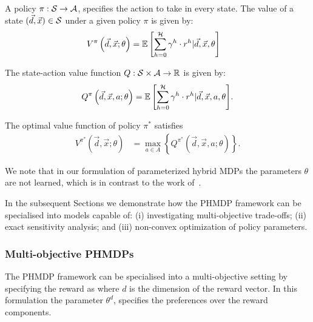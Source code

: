 A policy {\footnotesize $\pi : \mathcal{S} \rightarrow \mathcal{A}$}, specifies the action to take in every state. The value of a state {\footnotesize $(\vec{d}, \vec{x}) \in \mathcal{S}$} under a given policy {\footnotesize$\pi$} is given by:
{\footnotesize 
    \abovedisplayskip=0pt
    \belowdisplayskip=0pt
\begin{align*}
    V^{\pi}\left( \vec{d}, \vec{x}; \theta \right) &= {\mathbb{E}\left[{\sum\limits_{h = 0}^{\mathcal{H}} \gamma^h \cdot r^h | \vec{d}, \vec{x}, \theta}\right]} \nonumber  
\end{align*}
}

The state-action value function {\footnotesize$Q : \mathcal{S} \times \mathcal{A} \rightarrow \mathbb{R}$} is given by:
{\footnotesize 
    \abovedisplayskip=0pt
    \belowdisplayskip=0pt
\begin{align*}
    Q^{\pi}\left(\vec{d}, \vec{x}, a; \theta\right) = {\mathbb{E}\left[{\sum\limits_{h = 0}^{\mathcal{H}} \gamma^h \cdot r^h | \vec{d}, \vec{x}, a, \theta}\right]}.
\end{align*}
}

The optimal value function of policy {\footnotesize$ \pi^{*} $} satisfies
{\footnotesize 
\abovedisplayskip=0pt
\belowdisplayskip=0pt
\begin{align}
    \label{eq:opt_vfunc}
    V^{\pi^{*}}(\vec{d}, \vec{x}; \theta) &= \max_{a \in A} \left\{ Q^{\pi^{*}}(\vec{d}, \vec{x}, a; \theta) \right\}. 
\end{align}
}%

We note that in our formulation of parameterized hybrid MDPs the parameters {\footnotesize $ \theta $} are not learned, which is in contrast to the work of~\parencite{Dearden_UAI_1999}.

In the subsequent Sections we demonstrate how the PHMDP framework can be specialised into models capable of: (i) investigating multi-objective trade-offs; (ii) exact sensitivity analysis; and (iii) non-convex optimization of policy parameters.

\subsubsection{Multi-objective PHMDPs}

The PHMDP framework can be specialised into a multi-objective setting by specifying the reward as {\footnotesize \MORewardFunc} where {\footnotesize $ d $} is the dimension of the reward vector. In this formulation the parameter {\footnotesize $ \theta^{d} $}, specifies the preferences over the reward components.

